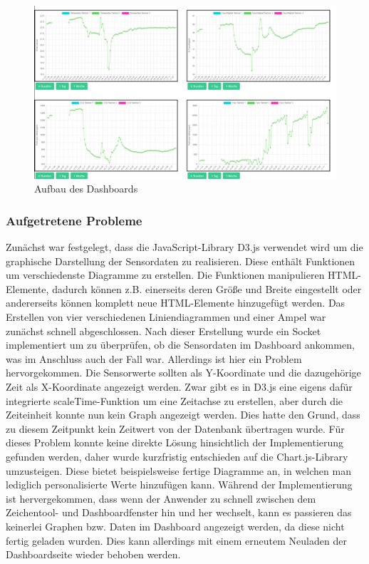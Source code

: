 \documentclass[]{article}
\begin{document}
			\begin{figure}[h]
				\centering
				\includegraphics[scale=0.40]{images/Dashboardbild}
				\caption{Aufbau des Dashboards}
				\label{img:Dashboardbild}
			\end{figure}
			
			\subsubsection{Aufgetretene Probleme}
			Zunächst war festgelegt, dass die JavaScript-Library D3.js verwendet wird um die graphische Darstellung der Sensordaten zu realisieren. Diese enthält Funktionen um verschiedenste Diagramme zu erstellen. Die Funktionen manipulieren HTML-Elemente, dadurch können z.B. einerseits deren Größe und Breite eingestellt oder andererseits können komplett neue HTML-Elemente hinzugefügt werden. Das Erstellen von vier verschiedenen Liniendiagrammen und einer Ampel war zunächst schnell abgeschlossen. Nach dieser Erstellung wurde ein Socket implementiert um zu überprüfen, ob die Sensordaten im Dashboard ankommen, was im Anschluss auch der Fall war. Allerdings ist hier ein Problem hervorgekommen.\newline
			Die Sensorwerte sollten als Y-Koordinate und die dazugehörige Zeit als X-Koordinate angezeigt werden. Zwar gibt es in D3.js eine eigens dafür integrierte scaleTime-Funktion um eine Zeitachse zu erstellen, aber durch die Zeiteinheit konnte nun kein Graph angezeigt werden. Dies hatte den Grund, dass zu diesem Zeitpunkt kein Zeitwert von der Datenbank übertragen wurde. Für dieses Problem konnte keine direkte Lösung hinsichtlich der Implementierung gefunden werden, daher wurde kurzfristig entschieden auf die Chart.js-Library umzusteigen. Diese bietet beispielsweise fertige Diagramme an, in welchen man lediglich personalisierte Werte hinzufügen kann.\newline 
			Während der Implementierung ist hervergekommen, dass wenn der Anwender zu schnell zwischen dem Zeichentool- und Dashboardfenster hin und her wechselt, kann es passieren das keinerlei Graphen bzw. Daten im Dashboard angezeigt werden, da diese nicht fertig geladen wurden. Dies kann allerdings mit einem erneutem Neuladen der Dashboardseite wieder behoben werden. %
\end{document}
